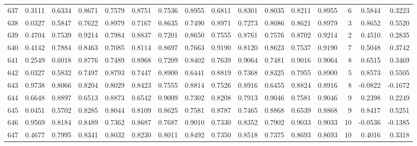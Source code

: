 \begin{tabular}{lrrrrrrrrrrrrrrr}
637 &      0.3111 &  0.6334 &  0.8671 &  0.7579 &  0.8751 &  0.7536 &  0.8955 &  0.6811 &  0.8301 &  0.8035 &   0.8211 &     0.8955 &      6 &                    0.5844 &                     0.3223 \\
638 &      0.0327 &  0.5847 &  0.7622 &  0.8979 &  0.7167 &  0.8635 &  0.7490 &  0.8971 &  0.7273 &  0.8086 &   0.8621 &     0.8979 &      3 &                    0.8652 &                     0.5520 \\
639 &      0.4704 &  0.7539 &  0.9214 &  0.7984 &  0.8837 &  0.7201 &  0.8650 &  0.7555 &  0.8761 &  0.7576 &   0.8702 &     0.9214 &      2 &                    0.4510 &                     0.2835 \\
640 &      0.4142 &  0.7884 &  0.8463 &  0.7085 &  0.8114 &  0.8697 &  0.7663 &  0.9190 &  0.8120 &  0.8623 &   0.7537 &     0.9190 &      7 &                    0.5048 &                     0.3742 \\
641 &      0.2549 &  0.6018 &  0.8776 &  0.7489 &  0.8968 &  0.7209 &  0.8402 &  0.7639 &  0.9064 &  0.7481 &   0.9016 &     0.9064 &      8 &                    0.6515 &                     0.3469 \\
642 &      0.0327 &  0.5832 &  0.7497 &  0.8793 &  0.7447 &  0.8900 &  0.6441 &  0.8819 &  0.7368 &  0.8325 &   0.7955 &     0.8900 &      5 &                    0.8573 &                     0.5505 \\
643 &      0.9738 &  0.8066 &  0.8204 &  0.8029 &  0.8423 &  0.7555 &  0.8814 &  0.7526 &  0.8916 &  0.6455 &   0.8824 &     0.8916 &      8 &                   -0.0822 &                    -0.1672 \\
644 &      0.6648 &  0.8897 &  0.6513 &  0.8873 &  0.6542 &  0.9009 &  0.7302 &  0.8208 &  0.7913 &  0.9046 &   0.7581 &     0.9046 &      9 &                    0.2398 &                     0.2249 \\
645 &      0.0451 &  0.5702 &  0.8285 &  0.8044 &  0.8109 &  0.8625 &  0.7581 &  0.8787 &  0.7465 &  0.8868 &   0.6539 &     0.8868 &      9 &                    0.8417 &                     0.5251 \\
646 &      0.9569 &  0.8184 &  0.8489 &  0.7362 &  0.8687 &  0.7687 &  0.9010 &  0.7330 &  0.8352 &  0.7902 &   0.9033 &     0.9033 &     10 &                   -0.0536 &                    -0.1385 \\
647 &      0.4677 &  0.7995 &  0.8341 &  0.8032 &  0.8230 &  0.8011 &  0.8492 &  0.7350 &  0.8518 &  0.7375 &   0.8693 &     0.8693 &     10 &                    0.4016 &                     0.3318 \\

\end{tabular}
